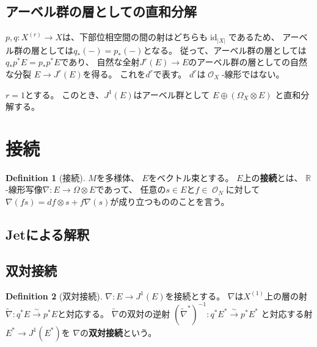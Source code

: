 \documentclass[uplatex]{jsarticle}
\theoremstyle{definition}
\newtheorem{defi}[defi]{Definition}
\DeclareMathOperator{\id}{\mathrm{id}}
\newcommand{\R}{\mathbb{R}}
\newcommand{\mcO}{\mathcal{O}}
\DeclareMathOperator{\OOO}{\mcO}
\newcommand{\OM}{{\OOO_N}}
\newcommand{\OX}{{\OOO_X}}
\begin{document}
\subsection{アーベル群の層としての直和分解}


\(p,q:X^{(r)}\to X\)は、下部位相空間の間の射はどちらも\(\id_{|X|}\)であるため、
アーベル群の層としては\(q_*(-) = p_*(-)\)となる。
従って、アーベル群の層としては
\(q_*p^*E = p_*p^*E\)であり、
自然な全射\(J^r(E) \to E\)のアーベル群の層としての自然な分裂
\(E\to J^r(E)\)を得る。
これを\(d^r\)で表す。
\(d^r\)は\(\OX\)-線形ではない。

\(r=1\)とする。
このとき、\(J^1(E)\)はアーベル群として
\(E\oplus (\Omega_X\otimes E)\)
と直和分解する。









\section{接続}


\begin{defi}[接続]
  \(M\)を多様体、
  \(E\)をベクトル束とする。
  \(E\)上の\textbf{接続}とは、
  \(\R\)-線形写像\(\nabla:E\to \Omega\otimes E\)であって、
  任意の\(s\in E\)と\(f\in \OM\)に対して
  \(\nabla(fs) = df\otimes s + f\nabla(s)\)が成り立つもののことを言う。
\end{defi}


\subsection{Jetによる解釈}
\label{sub: conn 1-jet}






\subsection{双対接続}
\label{sub: dual conn}


\begin{defi}[双対接続]
  \(\nabla:E\to J^1(E)\)を接続とする。
  \(\nabla\)は\(X^{(1)}\)上の層の射
  \(\tilde{\nabla}: q^*E \xrightarrow{\sim} p^*E\)と対応する。
  \(\tilde{\nabla}\)の双対の逆射
  \((\tilde{\nabla}^*)^{-1}: q^*E^* \xrightarrow{\sim} p^*E^*\)
  と対応する射
  \(E^* \to J^1(E^*)\)を
  \(\nabla\)の\textbf{双対接続}という。
\end{defi}
\end{document}

